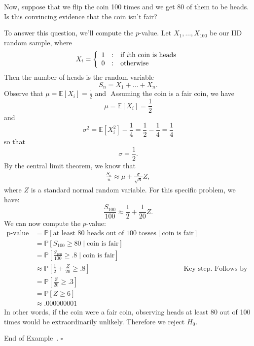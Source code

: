 \documentclass[10pt]{article}
\theoremstyle{definition}
\newtheorem{example}[theorem]{Example}
\renewenvironment{example}
{\begin{oldexample}}
  {\par\smallskip\hfill   End of Example~\theexample. $\square$    \par\end{oldexample}}
\newcommand{\1}[1]{\textbf{1}_{\left[#1\right]}} %
\def\E{\mathbb{E}} %
\def\P{\mathbb{P}} %
\begin{document}
\begin{example}
  Now, suppose that we flip the coin 100 times and we get 80 of them to be
  heads. Is this convincing evidence that the coin isn't fair?

  To answer this question, we'll compute the $p$-value. Let
  $X_{1},\ldots,X_{100}$ be our IID random sample, where
  \begin{equation*}
    X_{i} = \left\{ \begin{array}{l@{\quad:\quad}l}
        1 & \text{if $i$th coin is heads}\\
        0& \text{otherwise} \end{array}\right.
  \end{equation*}
  Then the number of heads is the random variable
  \begin{equation*}
    S_{n} = X_{1}+\ldots+X_{n}.
  \end{equation*}
  Observe that $\mu= \E\left[X_{i} \right]= \frac{1}{2}$ and $ $ Assuming the
  coin is a fair coin, we have
  \begin{equation*}
    \mu = \E\left[X_{i} \right] = \frac{1}{2}
  \end{equation*}
  and
  \begin{equation*}
    \sigma^{2} = \E\left[X_{i}^{2} \right] - \frac{1}{4} = \frac{1}{2}-\frac{1}{4} = \frac{1}{4}
  \end{equation*}
  so that
  \begin{equation*}
    \sigma= \frac{1}{2}.
  \end{equation*}
  By the central limit theorem, we know that
  \begin{align*}
    \frac{S_{n}}{n} \approx \mu + \frac{\sigma}{\sqrt{n}}Z, 
  \end{align*}
  where $Z$ is a standard normal random variable. For this specific problem,
  we have:
  \begin{equation*}
    \frac{S_{100}}{100} \approx \frac{1}{2}+\frac{1}{20}Z.
  \end{equation*}
  We can now compute the $p$-value:
  \begin{align*}
    \text{p-value }
    &= \P\left[\text{at least 80 heads out of 100 tosses}\mid \text{coin is fair} \right]\\
    &= \P\left[S_{100}\geq 80 \mid \text{coin is fair}\right]\\
    &= \P\left[\frac{S_{100}}{100}\geq .8 \mid \text{coin is fair}\right]\\
    &\approx \P\left[\frac{1}{2}+\frac{Z}{20} \geq .8\right] &&\text{Key
                                                                step. Follows by CLT.}\\
    &= \P\left[\frac{Z}{20} \geq .3\right]\\
    &= \P\left[Z \geq 6 \right]\\
    &\approx .000000001
  \end{align*}
  In other words, if the coin were a fair coin, observing heads at least 80 out of 100
  times would be extraordinarily unlikely. Therefore we reject $H_{0}$. 
\end{example}
\end{document}
